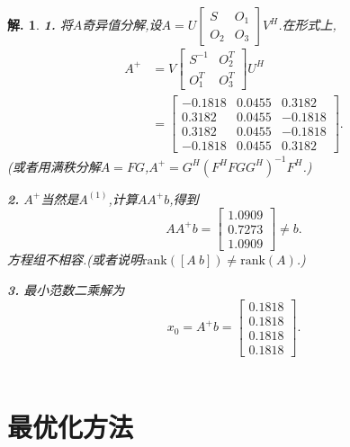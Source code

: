 \documentclass[oneside,a4paper,12pt]{ctexbook}
\theoremstyle{nonumberplain}
\theoremstyle{nonumberplain}
\newtheorem{insolution}{解.}
\theoremstyle{nonumberplain}
\newenvironment{solution}{
    \begin{tcolorbox}[enhanced,colback=cyan!5!white,colframe=cyan!75!black,drop fuzzy shadow,breakable,arc=0mm]
        \begin{insolution}
}{
        \end{insolution}
    \end{tcolorbox}
}
\newcommand{\rank}{\mathrm{rank}}
\begin{document}
    \begin{solution}
        \textbf{1. }将$A$奇异值分解,设$A=U\begin{bmatrix}
            S & O_1\\
            O_2 & O_3
        \end{bmatrix}V^H$.在形式上,
        \begin{align*}
            A^+&=V\begin{bmatrix}
               S^{-1} & O_2^T\\
               O_1^T & O_3^T 
            \end{bmatrix}U^H\\
            &=\begin{bmatrix}
                -0.1818 & 0.0455 & 0.3182\\
                0.3182 & 0.0455 & -0.1818\\
                0.3182 & 0.0455 & -0.1818\\
                -0.1818 & 0.0455 & 0.3182
            \end{bmatrix}.
        \end{align*}
        (或者用满秩分解$A=FG$,$A^+=G^H(F^HFGG^H)^{-1}F^H$.)

        \textbf{2. }$A^+$当然是$A^{(1)}$,计算$AA^+b$,得到
        \begin{equation*}
            AA^+b=\begin{bmatrix}
                1.0909\\
                0.7273\\
                1.0909
            \end{bmatrix}\neq b.
        \end{equation*}
        方程组不相容.(或者说明$\rank([A\ b])\neq\rank(A)$.)

        \textbf{3. }最小范数二乘解为
        \begin{equation*}
            x_0=A^+b=\begin{bmatrix}
                0.1818\\
                0.1818\\
                0.1818\\
                0.1818
            \end{bmatrix}.
        \end{equation*}
        \ 
    \end{solution}

    \newpage

    \chapter{最优化方法}
\end{document}
